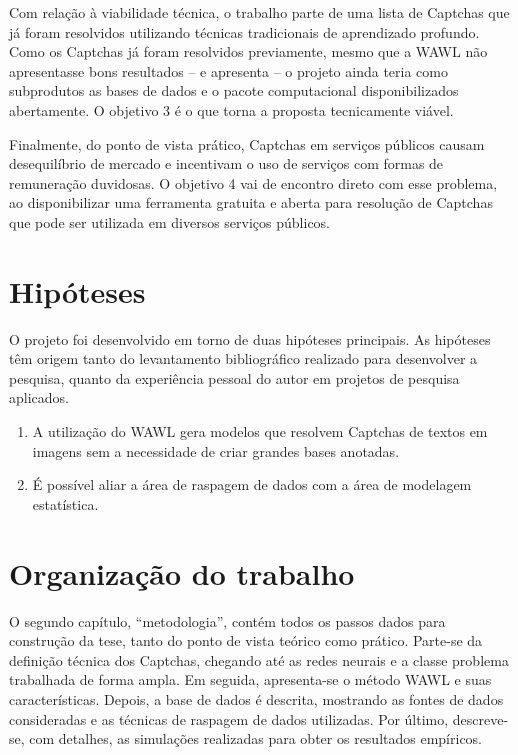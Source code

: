 \documentclass[12pt,twoside,brazilian]{book}
\begin{document}
Com relação à viabilidade técnica, o trabalho parte de uma lista de
Captchas que já foram resolvidos utilizando técnicas tradicionais de
aprendizado profundo. Como os Captchas já foram resolvidos previamente,
mesmo que a WAWL não apresentasse bons resultados -- e apresenta -- o
projeto ainda teria como subprodutos as bases de dados e o pacote
computacional disponibilizados abertamente. O objetivo 3 é o que torna a
proposta tecnicamente viável.

Finalmente, do ponto de vista prático, Captchas em serviços públicos
causam desequilíbrio de mercado e incentivam o uso de serviços com
formas de remuneração duvidosas. O objetivo 4 vai de encontro direto com
esse problema, ao disponibilizar uma ferramenta gratuita e aberta para
resolução de Captchas que pode ser utilizada em diversos serviços
públicos.

\hypertarget{sec-hipoteses}{%
\section{Hipóteses}\label{sec-hipoteses}}

O projeto foi desenvolvido em torno de duas hipóteses principais. As
hipóteses têm origem tanto do levantamento bibliográfico realizado para
desenvolver a pesquisa, quanto da experiência pessoal do autor em
projetos de pesquisa aplicados.

\begin{enumerate}
\def\labelenumi{\arabic{enumi}.}
\item
  A utilização do WAWL gera modelos que resolvem Captchas de textos em
  imagens sem a necessidade de criar grandes bases anotadas.
\item
  É possível aliar a área de raspagem de dados com a área de modelagem
  estatística.
\end{enumerate}

\hypertarget{sec-organizacao}{%
\section{Organização do trabalho}\label{sec-organizacao}}

O segundo capítulo, ``metodologia'', contém todos os passos dados para
construção da tese, tanto do ponto de vista teórico como prático.
Parte-se da definição técnica dos Captchas, chegando até as redes
neurais e a classe problema trabalhada de forma ampla. Em seguida,
apresenta-se o método WAWL e suas características. Depois, a base de
dados é descrita, mostrando as fontes de dados consideradas e as
técnicas de raspagem de dados utilizadas. Por último, descreve-se, com
detalhes, as simulações realizadas para obter os resultados empíricos.
\end{document}
